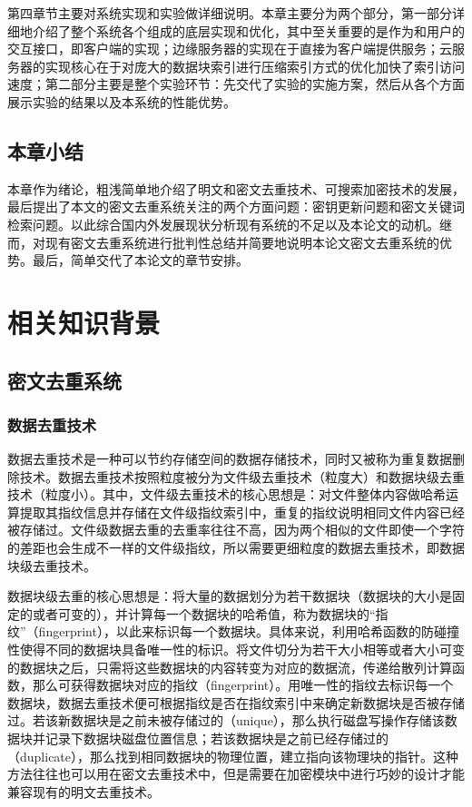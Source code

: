 \documentclass[promaster]{thesis-uestc}
\begin{document}
第四章节主要对系统实现和实验做详细说明。本章主要分为两个部分，第一部分详细地介绍了整个系统各个组成的底层实现和优化，其中至关重要的是作为和用户的交互接口，即客户端的实现；边缘服务器的实现在于直接为客户端提供服务；云服务器的实现核心在于对庞大的数据块索引进行压缩索引方式的优化加快了索引访问速度；第二部分主要是整个实验环节：先交代了实验的实施方案，然后从各个方面展示实验的结果以及本系统的性能优势。

\section{本章小结}
本章作为绪论，粗浅简单地介绍了明文和密文去重技术、可搜索加密技术的发展，最后提出了本文的密文去重系统关注的两个方面问题：密钥更新问题和密文关键词检索问题。以此综合国内外发展现状分析现有系统的不足以及本论文的动机。继而，对现有密文去重系统进行批判性总结并简要地说明本论文密文去重系统的优势。最后，简单交代了本论文的章节安排。

\chapter{相关知识背景}

\section{密文去重系统}

\subsection{数据去重技术}\label{指纹}
数据去重技术是一种可以节约存储空间的数据存储技术，同时又被称为重复数据删除技术。数据去重技术按照粒度被分为文件级去重技术（粒度大）和数据块级去重技术（粒度小）。其中，文件级去重技术的核心思想是：对文件整体内容做哈希运算提取其指纹信息并存储在文件级指纹索引中，重复的指纹说明相同文件内容已经被存储过。文件级数据去重的去重率往往不高，因为两个相似的文件即使一个字符的差距也会生成不一样的文件级指纹，所以需要更细粒度的数据去重技术，即数据块级去重技术。

数据块级去重的核心思想是：将大量的数据划分为若干数据块（数据块的大小是固定的或者可变的），并计算每一个数据块的哈希值，称为数据块的“指纹”（fingerprint），以此来标识每一个数据块。具体来说，利用哈希函数的防碰撞性使得不同的数据块具备唯一性的标识。将文件切分为若干大小相等或者大小可变的数据块之后，只需将这些数据块的内容转变为对应的数据流，传递给散列计算函数，那么可获得数据块对应的指纹（fingerprint）。用唯一性的指纹去标识每一个数据块，数据去重技术便可根据指纹是否在指纹索引中来确定新数据块是否被存储过。若该新数据块是之前未被存储过的（unique），那么执行磁盘写操作存储该数据块并记录下数据块磁盘位置信息；若该数据块是之前已经存储过的（duplicate），那么找到相同数据块的物理位置，建立指向该物理块的指针。这种方法往往也可以用在密文去重技术中，但是需要在加密模块中进行巧妙的设计才能兼容现有的明文去重技术。
\end{document}
